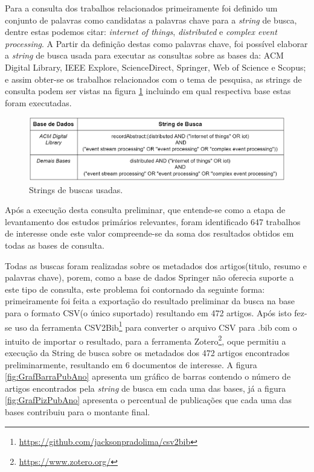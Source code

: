 \documentclass[tid,table]{texufpel} %
\begin{document}
Para a consulta dos trabalhos relacionados primeiramente foi definido um conjunto de palavras como candidatas a palavras chave para a \textit{string} de busca, dentre estas podemos citar: \textit{internet of things}, \textit{distributed} e \textit{complex event processing}. A Partir da definição destas como palavras chave, foi possível elaborar a \textit{string} de busca usada para executar as consultas sobre as bases da: ACM Digital Library, IEEE Explore, ScienceDirect, Springer, Web of Science e Scopus; e assim obter-se os trabalhos relacionados com o tema de pesquisa, as strings de consulta podem ser vistas na figura \ref{tab:stringBusca} incluindo em qual respectiva base estas foram executadas.



\begin{figure}[ht]
	\centering
	\includegraphics[width=1\textwidth]{imagens/tabela_string_busca.png}
	\caption{Strings de buscas usadas.}
	\label{tab:stringBusca}
\end{figure}

Após a execução desta consulta preliminar, que entende-se como a etapa de levantamento dos estudos primários relevantes, foram identificado 647 trabalhos de interesse onde este valor  compreende-se da soma dos resultados obtidos em todas as bases de consulta.

Todas as buscas foram realizadas sobre os metadados dos artigos(titulo, resumo e palavras chave), porem, como a base de dados Springer não oferecia suporte a este tipo de consulta, este problema foi contornado da seguinte forma: primeiramente foi feita a exportação do resultado preliminar da busca na base para o formato CSV(o único suportado) resultando em 472 artigos. Após isto fez-se uso da ferramenta CSV2Bib\footnote{\url{https://github.com/jacksonpradolima/csv2bib}} para converter o arquivo CSV para .bib com o intuito de importar o resultado, para a ferramenta Zotero\footnote{\url{https://www.zotero.org/}}, oque permitiu a execução da String de busca sobre os metadados dos 472 artigos encontrados preliminarmente, resultando em 6 documentos de interesse. A figura  \ref{fig:GrafBarraPubAno} apresenta um gráfico de barras contendo o número de artigos encontrados pela \textit{string} de busca em cada uma das bases, já a figura \ref{fig:GrafPizPubAno} apresenta o percentual de publicações que cada uma das bases contribuiu para o montante final.
\end{document}

